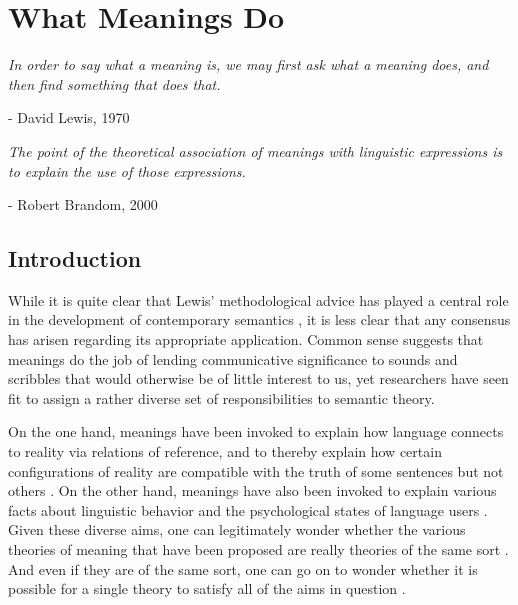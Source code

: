 
\chapter{What Meanings Do}
\renewcommand{\epigraphrule}{0pt}
\setlength{\epigraphwidth}{4.5in}
\epigraph{\textit{In order to say what a meaning is, we may first ask what a meaning does, and then find something that does that.}}{- David Lewis, 1970}

\setlength{\epigraphwidth}{4.5in}
\epigraph{\textit{The point of the theoretical association of meanings with linguistic expressions is to explain the use of those expressions.}}{- Robert Brandom, 2000}

\section{Introduction}

While it is quite clear that Lewis' methodological advice has played a central role in the development of contemporary semantics \citep{LiangPotts:2015}, it is less clear that any consensus has arisen regarding its appropriate application. Common sense suggests that meanings do the job of lending communicative significance to sounds and scribbles that would otherwise be of little interest to us, yet researchers have seen fit to assign a rather diverse set of responsibilities to semantic theory. 

On the one hand, meanings have been invoked to explain how language connects to reality via relations of reference, and to thereby explain how certain configurations of reality are compatible with the truth of some sentences but not others \citep{Speaks:2014,Lewis:1970,Soames:2010}. On the other hand, meanings have also been invoked to explain various facts about linguistic behavior \citep{Wittgenstein:1953,Brandom:1994,Brandom:2000,Horwich:2005,Horwich:1998} and the psychological states of language users \citep{Block:1986,Harman:1982}. Given these diverse aims, one can legitimately wonder whether the various theories of meaning that have been proposed are really theories of the same sort \citep{Block:1986}. And even if they are of the same sort, one can go on to wonder whether it is possible for a single theory to satisfy all of the aims in question \citep{Horwich:1998}. 

